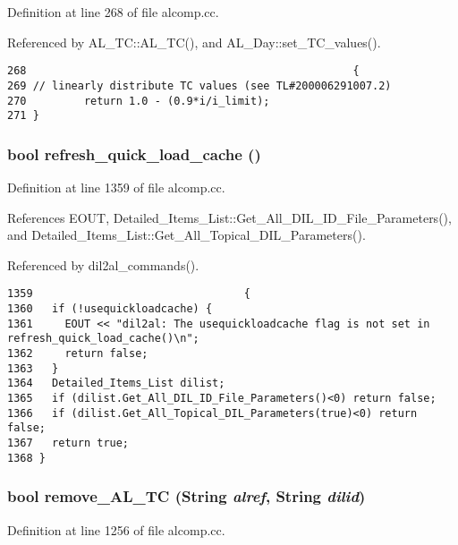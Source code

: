 Definition at line 268 of file alcomp.cc.

Referenced by AL\_\-TC::AL\_\-TC(), and AL\_\-Day::set\_\-TC\_\-values().



\footnotesize\begin{verbatim}268                                                   {
269 // linearly distribute TC values (see TL#200006291007.2)
270         return 1.0 - (0.9*i/i_limit);
271 }
\end{verbatim}\normalsize 
{}
\subsubsection{\setlength{\rightskip}{0pt plus 5cm}bool refresh\_\-quick\_\-load\_\-cache ()}\label{alcomp_8cc_a17}




Definition at line 1359 of file alcomp.cc.

References EOUT, Detailed\_\-Items\_\-List::Get\_\-All\_\-DIL\_\-ID\_\-File\_\-Parameters(), and Detailed\_\-Items\_\-List::Get\_\-All\_\-Topical\_\-DIL\_\-Parameters().

Referenced by dil2al\_\-commands().



\footnotesize\begin{verbatim}1359                                 {
1360   if (!usequickloadcache) {
1361     EOUT << "dil2al: The usequickloadcache flag is not set in refresh_quick_load_cache()\n";
1362     return false;
1363   }
1364   Detailed_Items_List dilist;
1365   if (dilist.Get_All_DIL_ID_File_Parameters()<0) return false;
1366   if (dilist.Get_All_Topical_DIL_Parameters(true)<0) return false;
1367   return true;
1368 }
\end{verbatim}\normalsize 
{}
\subsubsection{\setlength{\rightskip}{0pt plus 5cm}bool remove\_\-AL\_\-TC ({\bf String} {\em alref}, {\bf String} {\em dilid})}\label{alcomp_8cc_a15}




Definition at line 1256 of file alcomp.cc.

